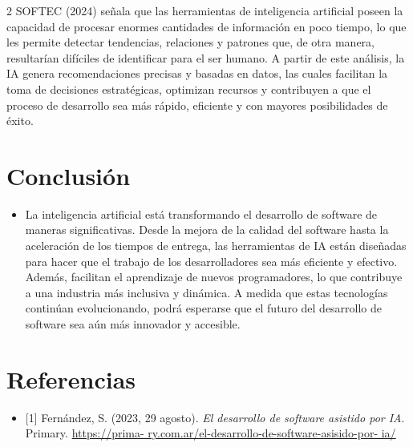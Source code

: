 \documentclass[12pt,spanish,Letterpaper,openany]{book}
\providecommand{\tightlist}{%
  \setlength{\itemsep}{0pt}\setlength{\parskip}{0pt}}
\begin{document}
\begin {multicols}{2}
SOFTEC (2024) señala que las herramientas de inteligencia artificial poseen la capacidad de procesar enormes cantidades de información en poco tiempo, lo que les permite detectar tendencias, relaciones y patrones que, de otra manera, resultarían difíciles de identificar para el ser humano. A partir de este análisis, la IA genera recomendaciones precisas y basadas en datos, las cuales facilitan la toma de decisiones estratégicas, optimizan recursos y contribuyen a que el proceso de desarrollo sea más rápido, eficiente y con mayores posibilidades de éxito.

\hypertarget{conclusiuxf3n}{%
\section{Conclusión}\label{conclusiuxf3n}}

\begin{itemize}
\tightlist
\item
  La inteligencia artificial está transformando el desarrollo de software de maneras significativas. Desde la mejora de la calidad del software hasta la aceleración de los tiempos de entrega, las herramientas de IA están diseñadas para hacer que el trabajo de los desarrolladores sea más eficiente y efectivo. Además, facilitan el aprendizaje de nuevos programadores, lo que contribuye a una industria más inclusiva y dinámica. A medida que estas tecnologías continúan evolucionando, podrá esperarse que el futuro del desarrollo de software sea aún más innovador y accesible.
\end{itemize}

\hypertarget{referencias-5}{%
\section{Referencias}\label{referencias-5}}

\begin{itemize}
\tightlist
\item
  {[}1{]} Fernández, S. (2023, 29 agosto). \emph{El desarrollo de software asistido por IA}. Primary. \href{https://primary.com.ar/el-desarrollo-de-software-asistido-por-ia/}{https://prima-
  ry.com.ar/el-desarrollo-de-software-asisido-por-
  ia/}
\end{itemize}

\bigskip
\bigskip


\end{multicols}
\end{document}
